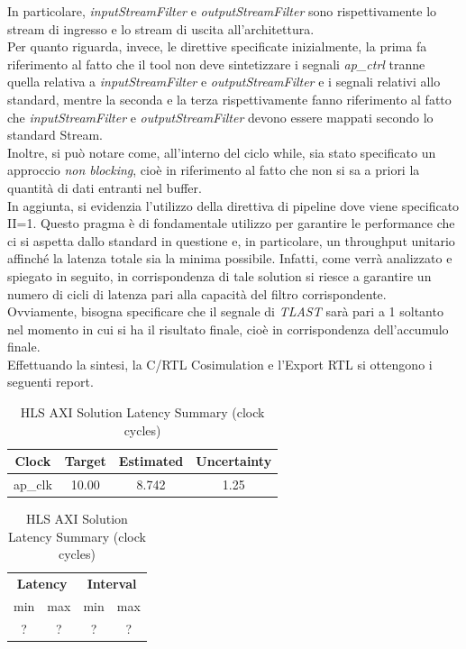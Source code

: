 In particolare, \textit{inputStreamFilter} e \textit{outputStreamFilter} sono rispettivamente lo stream di ingresso e lo stream di uscita all'architettura. 
\\
Per quanto riguarda, invece, le direttive specificate inizialmente, la prima fa riferimento al fatto che il tool non deve sintetizzare i segnali \textit{ap\_ctrl} tranne quella relativa a \textit{inputStreamFilter} e \textit{outputStreamFilter} e i segnali relativi allo standard, mentre la seconda e la terza rispettivamente fanno riferimento al fatto che \textit{inputStreamFilter} e \textit{outputStreamFilter} devono essere mappati secondo lo standard Stream.
\\
Inoltre, si può notare come, all'interno del ciclo while, sia stato specificato un approccio \textit{non blocking}, cioè in riferimento al fatto che non si sa a priori la quantità di dati entranti nel buffer.
\\
In aggiunta, si evidenzia l'utilizzo della direttiva di pipeline dove viene specificato II=1. Questo pragma è di fondamentale utilizzo per garantire le performance che ci si aspetta dallo standard in questione e, in particolare, un throughput unitario affinché la latenza totale sia la minima possibile. Infatti, come verrà analizzato e spiegato in seguito, in corrispondenza di tale solution si riesce a garantire un numero di cicli di latenza pari alla capacità del filtro corrispondente.
\\
Ovviamente, bisogna specificare che il segnale di \textit{TLAST} sarà pari a 1 soltanto nel momento in cui si ha il risultato finale, cioè in corrispondenza dell'accumulo finale.
\\
Effettuando la sintesi, la C/RTL Cosimulation e l'Export RTL si ottengono i seguenti report.

\begin{table}[H]
	\centering
	\begin{minipage}[t]{0.45\linewidth}
		\centering
		\begin{tabular}{|c|c|c|c|}
			\hline
			\textbf{Clock} & \textbf{Target} & \textbf{Estimated} & \textbf{Uncertainty} \\
			\hline
			ap\_clk & 10.00 & 8.742 & 1.25 \\
			\hline
		\end{tabular}
		\caption{HLS AXI Solution Timing Summary (ns)}
		\label{tab:hls-axi-solution-timing-summary}
	\end{minipage}
	\hfill
	\begin{minipage}[t]{0.45\linewidth}
		\centering
		\begin{tabular}{|c|c|c|c|}
			\hline
			\multicolumn{2}{|c|}{\textbf{Latency}} & \multicolumn{2}{|c|}{\textbf{Interval}} \\
			min & max & min & max \\
			\hline
			? & ? & ? & ? \\
			\hline
		\end{tabular}
		\caption{HLS AXI Solution Latency Summary (clock cycles)}
		\label{tab:hls-axi-solution-latency-summary}
	\end{minipage}
\end{table}

